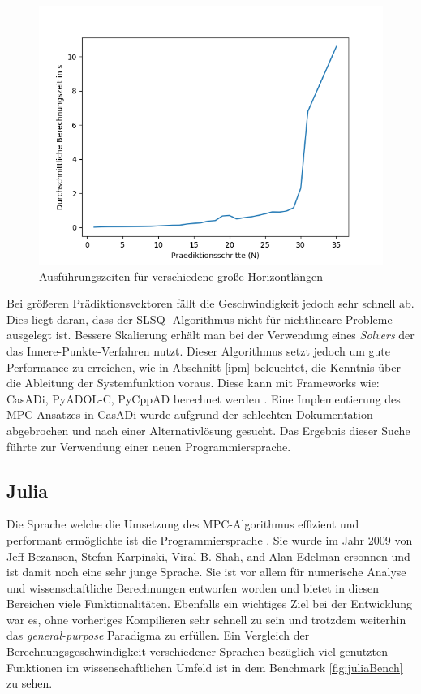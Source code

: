 \documentclass{like}
\begin{document}
\begin{figure}[ht!]
	\includegraphics[width=400pt]{Abbildungen/pythonDummy.png}
	\caption{Ausführungszeiten für verschiedene  große Horizontlängen}
	\label{fig:pythonBench}
\end{figure}

Bei größeren Prädiktionsvektoren fällt die Geschwindigkeit jedoch sehr schnell ab.
Dies liegt daran, dass der SLSQ- Algorithmus nicht für nichtlineare Probleme ausgelegt ist. Bessere Skalierung erhält man bei der Verwendung eines \textit{Solvers} der das Innere-Punkte-Verfahren nutzt. Dieser Algorithmus setzt jedoch um gute Performance zu erreichen, wie in Abschnitt \ref{ipm} beleuchtet, die Kenntnis über die Ableitung der Systemfunktion voraus. Diese kann mit Frameworks wie: CasADi, PyADOL-C, PyCppAD berechnet werden \cite{DBLP:journals/corr/TurkinT16}. 
Eine Implementierung des \ac{MPC}-Ansatzes in CasADi wurde  aufgrund der schlechten Dokumentation abgebrochen und nach einer Alternativlösung gesucht. Das Ergebnis dieser Suche führte zur Verwendung einer neuen Programmiersprache. 


\subsection{Julia}
\label{julia}
Die Sprache welche die Umsetzung des \acl{MPC}-Algorithmus effizient und performant ermöglichte ist die Programmiersprache . Sie wurde im Jahr 2009 von Jeff Bezanson, Stefan Karpinski, Viral B. Shah, and Alan Edelman ersonnen und ist damit noch eine sehr junge Sprache. Sie ist vor allem für numerische Analyse und wissenschaftliche Berechnungen entworfen worden und bietet in diesen Bereichen viele Funktionalitäten. Ebenfalls ein wichtiges Ziel bei der Entwicklung war es, ohne vorheriges Kompilieren sehr schnell zu sein und trotzdem weiterhin das \textit{general-purpose} Paradigma zu erfüllen. Ein Vergleich der Berechnungsgeschwindigkeit verschiedener Sprachen bezüglich viel genutzten Funktionen im wissenschaftlichen Umfeld ist in dem Benchmark \ref{fig:juliaBench} zu sehen.
\end{document}

